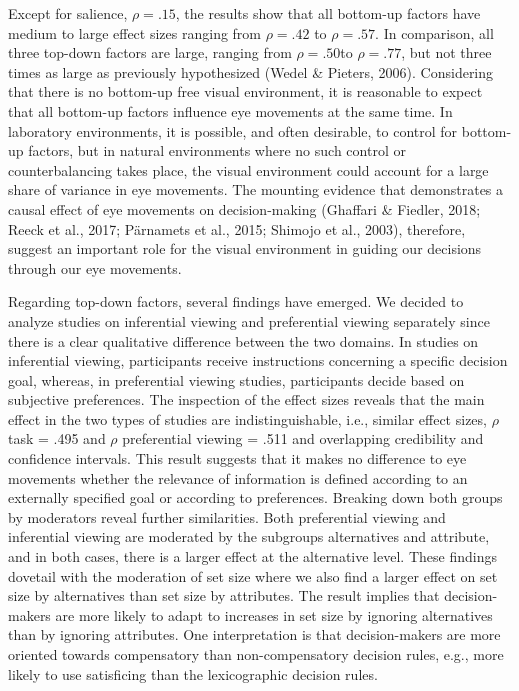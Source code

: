 \documentclass{article}
\begin{document}
Except for salience, $\rho = .15$, the results show that all bottom-up factors have medium to large effect sizes ranging from $\rho = .42$ to $\rho = .57$. In comparison, all three top-down factors are large, ranging from $\rho = .50$to $\rho = .77$, but not three times as large as previously hypothesized (Wedel \& Pieters, 2006). Considering that there is no bottom-up free visual environment, it is reasonable to expect that all bottom-up factors influence eye movements at the same time. In laboratory environments, it is possible, and often desirable, to control for bottom-up factors, but in natural environments where no such control or counterbalancing takes place, the visual environment could account for a large share of variance in eye movements. The mounting evidence that demonstrates a causal effect of eye movements on decision-making (Ghaffari \& Fiedler, 2018; Reeck et al., 2017; Pärnamets et al., 2015; Shimojo et al., 2003), therefore, suggest an important role for the visual environment in guiding our decisions through our eye movements. 

Regarding top-down factors, several findings have emerged. We decided to analyze studies on inferential viewing and preferential viewing separately since there is a clear qualitative difference between the two domains. In studies on inferential viewing, participants receive instructions concerning a specific decision goal, whereas, in preferential viewing studies, participants decide based on subjective preferences. The inspection of the effect sizes reveals that the main effect in the two types of studies are indistinguishable, i.e., similar effect sizes, $\rho$ task = .495 and $\rho$ preferential viewing  = .511 and overlapping credibility and confidence intervals. This result suggests that it makes no difference to eye movements whether the relevance of information is defined according to an externally specified goal or according to preferences. Breaking down both groups by moderators reveal further similarities. Both preferential viewing and inferential viewing are moderated by the subgroups alternatives and attribute, and in both cases, there is a larger effect at the alternative level. These findings dovetail with the moderation of set size where we also find a larger effect on set size by alternatives than set size by attributes. The result implies that decision-makers are more likely to adapt to increases in set size by ignoring alternatives than by ignoring attributes. One interpretation is that decision-makers are more oriented towards compensatory than non-compensatory decision rules, e.g., more likely to use satisficing than the lexicographic decision rules. 
\end{document}
